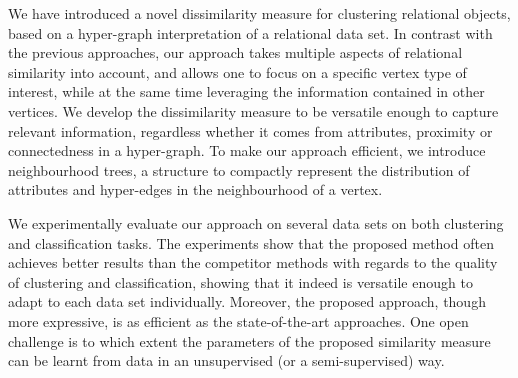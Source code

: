 We have introduced a novel dissimilarity measure for clustering relational objects, based on a hyper-graph interpretation of a relational data set.
In contrast with the previous approaches, our approach takes multiple aspects of relational similarity into account, and  allows one to focus on a specific vertex type of interest, while at the same time leveraging the information contained in other vertices.
We develop the dissimilarity measure to be versatile enough to capture relevant information, regardless whether it comes from attributes, proximity or connectedness in a hyper-graph.
To make our approach efficient, we introduce neighbourhood trees, a structure to compactly represent the distribution of attributes and hyper-edges in the neighbourhood of a vertex.


We experimentally evaluate our approach on several data sets on both clustering and classification tasks.
The experiments show that the proposed method often achieves better results than the competitor methods with regards to the quality of clustering and classification, showing that it indeed is versatile enough to adapt to each data set individually.
Moreover, the proposed approach, though more expressive, is as efficient as the state-of-the-art approaches.
One open challenge is to which extent the parameters of the proposed similarity measure can be learnt from data in an unsupervised (or a semi-supervised) way.


